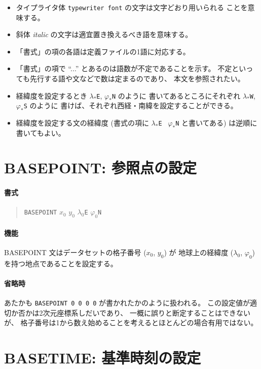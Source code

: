 \begin{itemize}
\item タイプライタ体 {\tt typewriter font} の文字は文字どおり用いられる
	ことを意味する。
\item 斜体 {\it italic} の文字は適宜置き換えるべき語を意味する。
\item 「書式」の項の各語は定義ファイルの1語に対応する。
\item 「書式」の項で ``...'' とあるのは語数が不定であることを示す。
	不定といっても先行する語や文などで数は定まるのであり、
	本文を参照されたい。
\item 経緯度を設定するとき
	$\lambda_*${\tt E}, $\varphi_*${\tt N} のように
	書いてあるところにそれぞれ
	$\lambda_*${\tt W}, $\varphi_*${\tt S} のように
	書けば、それぞれ西経・南緯を設定することができる。
\item 経緯度を設定する文の経緯度
	(書式の項に $\lambda_*${\tt E} \ $\varphi_*${\tt N} と書いてある)
	は逆順に書いてもよい。
\end{itemize}

\section{BASEPOINT: 参照点の設定}
\label{sec:def:BASEPOINT}
\paragraph{書式}
\begin{quote}
{\tt BASEPOINT} $x_0$ $y_0$ $\lambda_0${\tt E} $\varphi_0${\tt N}
\end{quote}
\paragraph{機能}
BASEPOINT 文はデータセットの格子番号 ($x_0$, $y_0$) が
地球上の経緯度 ($\lambda_0$, $\varphi_0$) を持つ地点であることを設定する。
\paragraph{省略時}
あたかも
{\tt BASEPOINT 0 0 0 0}
が書かれたかのように扱われる。
この設定値が適切か否かは2次元座標系しだいであり、
一概に誤りと断定することはできないが、
格子番号は1から数え始めることを考えるとほとんどの場合有用ではない。

\section{BASETIME: 基準時刻の設定}
\label{sec:def:BASETIME}
